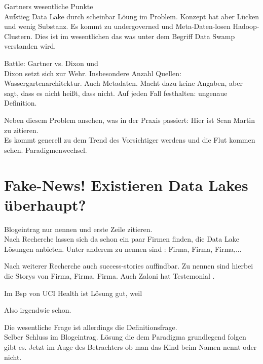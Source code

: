 \documentclass[twoside,twocolumn]{article}
\begin{document}
Gartners wesentliche Punkte\\
Aufstieg Data Lake durch scheinbar Löung im Problem. Konzept hat aber Lücken und wenig Substanz. Es kommt zu undergoverned und Meta-Daten-losen Hadoop-Clustern. Dies ist im wesentlichen das was unter dem Begriff Data Swamp verstanden wird.\cite{src3}

Battle: Gartner vs. Dixon und \\
Dixon setzt sich zur Wehr. Insbesondere Anzahl Quellen: Wassergartenarchitektur.\cite{src15} Auch Metadaten. Macht dazu keine Angaben, aber sagt, dass es nicht heißt, dass nicht.\cite{src14} Auf jeden Fall festhalten: ungenaue Definition.\

Neben diesem Problem ansehen, was in der Praxis passiert: Hier ist Sean Martin zu zitieren.\\
Es kommt generell zu dem Trend des Vorsichtiger werdens und die Flut kommen sehen. Paradigmenwechsel.\cite{src1}

\section{Fake-News! Existieren Data Lakes überhaupt?}
Blogeintrag nur nennen und erste Zeile zitieren.\cite{src4}\\

Nach Recherche lassen sich da schon ein paar Firmen finden, die Data Lake Lösungen anbieten.
Unter anderem zu nennen sind : Firma\cite{c1}, Firma\cite{c2}, Firma\cite{c3},...

Nach weiterer Recherche auch success-stories auffindbar. 
Zu nennen sind hierbei die Storys von Firma\cite{ss1}, Firma\cite{ss2}, Firma\cite{ss3}. Auch Zaloni hat Testemonial \cite{ss4}.

Im Bsp von UCI Health ist Lösung gut, weil \cite{src1}\cite{ss2} 

Also irgendwie schon.


Die wesentliche Frage ist allerdings die Definitionsfrage.\\
Selber Schluss im Blogeintrag. Lösung die dem Paradigma grundlegend folgen gibt es. Jetzt im Auge des Betrachters ob man das Kind beim Namen nennt oder nicht.










\end{document}
